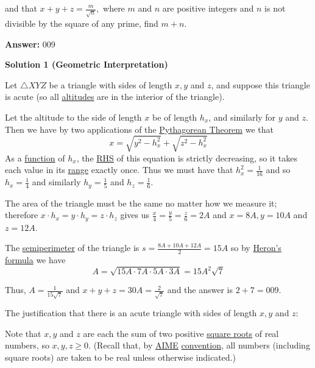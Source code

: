 \begin{enumerate}
and that $x+y+z = \frac{m}{\sqrt{n}},$ where $m$ and $n$ are positive integers and $n$ is not divisible by the square of any prime, find $m+n.$

 \textbf{Answer: }009



\textbf{Solution 1 (Geometric Interpretation)}

Let $\triangle XYZ$ be a triangle with sides of length $x, y$ and $z$, and suppose this triangle is acute (so all \href{https://artofproblemsolving.com/wiki/index.php?title=Altitude}{altitudes} are in the interior of the triangle).

 
Let the altitude to the side of length $x$ be of length $h_x$, and similarly for $y$ and $z$. Then we have by two applications of the \href{https://artofproblemsolving.com/wiki/index.php?title=Pythagorean\_Theorem}{Pythagorean Theorem} we that 
 \[x = \sqrt{y^2 - h_x^2} + \sqrt{z^2 - h_x^2}\] As a \href{https://artofproblemsolving.com/wiki/index.php?title=Function}{function} of $h_x$, the \href{https://artofproblemsolving.com/wiki/index.php?title=RHS}{RHS} of this equation is strictly decreasing, so it takes each value in its \href{https://artofproblemsolving.com/wiki/index.php?title=Range}{range} exactly once.  Thus we must have that $h_x^2 = \frac1{16}$ and so $h_x = \frac{1}4$ and similarly $h_y = \frac15$ and $h_z = \frac16$.

 
The area of the triangle must be the same no matter how we measure it; therefore $x\cdot h_x = y\cdot h_y = z \cdot h_z$ gives us $\frac x4 = \frac y5 = \frac z6 = 2A$ and $x = 8A, y = 10A$ and $z = 12A$.  

 
The \href{https://artofproblemsolving.com/wiki/index.php?title=Semiperimeter}{semiperimeter} of the triangle is $s = \frac{8A + 10A + 12A}{2} = 15A$ so by \href{https://artofproblemsolving.com/wiki/index.php?title=Heron\%27s\_formula}{Heron's formula} we have 
 \[A = \sqrt{15A \cdot 7A \cdot 5A \cdot 3A} = 15A^2\sqrt{7}\] 

 Thus, $A = \frac{1}{15\sqrt{7}}$ and $x + y + z = 30A = \frac2{\sqrt{7}}$ and the answer is $2 + 7 = \boxed{009}$.

 The justification that there is an acute triangle with sides of length $x, y$ and $z$:

 Note that $x, y$ and $z$ are each the sum of two positive \href{https://artofproblemsolving.com/wiki/index.php?title=Square\_root}{square roots} of real numbers, so $x, y, z \geq 0$.  (Recall that, by \href{https://artofproblemsolving.com/wiki/index.php?title=AIME}{AIME} \href{https://artofproblemsolving.com/wiki/index.php?title=Mathematical\_convention}{ convention}, all numbers (including square roots) are taken to be real unless otherwise indicated.)  


\end{enumerate}
